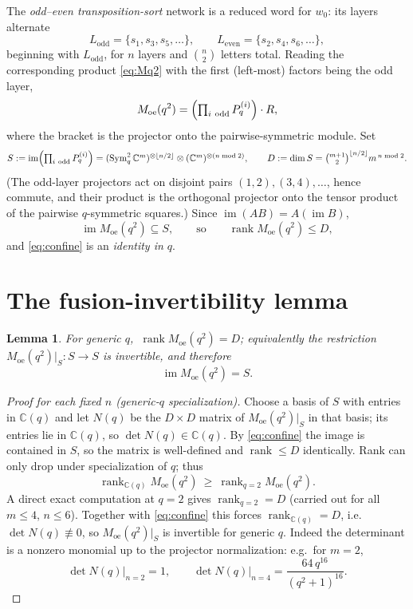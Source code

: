 \documentclass[11pt]{article}
\newtheorem{lemma}{Lemma}
\theoremstyle{definition}
\newcommand{\Sym}{\operatorname{Sym}}
\newcommand{\im}{\operatorname{im}}
\newcommand{\rank}{\operatorname{rank}}
\newcommand{\C}{\mathbb{C}}
\begin{document}
The \emph{odd--even transposition-sort} network is a reduced word for $w_0$:
its layers alternate
\[
   L_{\mathrm{odd}}=\{s_1,s_3,s_5,\dots\},\qquad
   L_{\mathrm{even}}=\{s_2,s_4,s_6,\dots\},
\]
beginning with $L_{\mathrm{odd}}$, for $n$ layers and $\binom n2$ letters total.
Reading the corresponding product \eqref{eq:Mq2} with the first (left-most)
factors being the odd layer,
\[
   M_{\mathrm{oe}}(q^2)=\Bigl(\textstyle\prod_{i\ \mathrm{odd}}P_q^{(i)}\Bigr)\cdot R,
\]
where the bracket is the projector onto the pairwise-symmetric module.  Set
\begin{equation}\label{eq:S}
   S:=\im\Bigl(\textstyle\prod_{i\ \mathrm{odd}}P_q^{(i)}\Bigr)
     =(\Sym^2_q\C^m)^{\otimes\lfloor n/2\rfloor}\otimes(\C^m)^{\otimes(n\bmod 2)},
   \qquad D:=\dim S=\binom{m+1}2^{\lfloor n/2\rfloor}m^{\,n\bmod 2}.
\end{equation}
(The odd-layer projectors act on disjoint pairs $(1,2),(3,4),\dots$, hence
commute, and their product is the orthogonal projector onto the tensor product
of the pairwise $q$-symmetric squares.)  Since $\im(AB)=A(\im B)$,
\begin{equation}\label{eq:confine}
   \im M_{\mathrm{oe}}(q^2)\subseteq S ,\qquad\text{so}\qquad
   \rank M_{\mathrm{oe}}(q^2)\le D ,
\end{equation}
and \eqref{eq:confine} is an \emph{identity in $q$}.

\section{The fusion-invertibility lemma}

\begin{lemma}\label{lem:fusion}
For generic $q$, $\ \rank M_{\mathrm{oe}}(q^2)=D$; equivalently the restriction
$M_{\mathrm{oe}}(q^2)\big|_S\colon S\to S$ is invertible, and therefore
\[
   \im M_{\mathrm{oe}}(q^2)=S .
\]
\end{lemma}

\begin{proof}[Proof for each fixed $n$ (generic-$q$ specialization)]
Choose a basis of $S$ with entries in $\C(q)$ and let $N(q)$ be the $D\times D$
matrix of $M_{\mathrm{oe}}(q^2)|_S$ in that basis; its entries lie in $\C(q)$, so
$\det N(q)\in\C(q)$.  By \eqref{eq:confine} the image is contained in $S$, so the
matrix is well-defined and $\rank\le D$ identically.  Rank can only drop under
specialization of $q$; thus
\[
   \rank_{\C(q)}M_{\mathrm{oe}}(q^2)\ \ge\ \rank_{q=2}M_{\mathrm{oe}}(q^2).
\]
A direct exact computation at $q=2$ gives $\rank_{q=2}=D$ (carried out for all
$m\le 4$, $n\le 6$).  Together with \eqref{eq:confine} this forces
$\rank_{\C(q)}=D$, i.e.\ $\det N(q)\not\equiv 0$, so $M_{\mathrm{oe}}(q^2)|_S$ is
invertible for generic $q$.  Indeed the determinant is a nonzero monomial up to
the projector normalization: e.g.\ for $m=2$,
\[
   \det N(q)\Big|_{n=2}=1,\qquad
   \det N(q)\Big|_{n=4}=\frac{64\,q^{16}}{(q^2+1)^{16}} .
\]
\end{proof}
\end{document}
